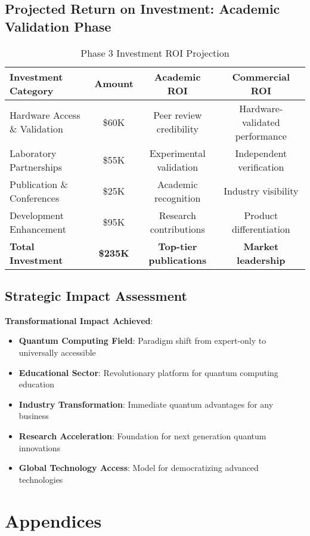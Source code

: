 \documentclass[12pt,a4paper]{article}
\begin{document}
\subsection{Projected Return on Investment: Academic Validation Phase}

\begin{table}[H]
\centering
\caption{Phase 3 Investment ROI Projection}
\begin{tabular}{|l|c|c|c|}
\hline
\textbf{Investment Category} & \textbf{Amount} & \textbf{Academic ROI} & \textbf{Commercial ROI} \\
\hline
Hardware Access \& Validation & \$60K & Peer review credibility & Hardware-validated performance \\
\hline
Laboratory Partnerships & \$55K & Experimental validation & Independent verification \\
\hline
Publication \& Conferences & \$25K & Academic recognition & Industry visibility \\
\hline
Development Enhancement & \$95K & Research contributions & Product differentiation \\
\hline
\textbf{Total Investment} & \textbf{\$235K} & \textbf{Top-tier publications} & \textbf{Market leadership} \\
\hline
\end{tabular}
\end{table}

\subsection{Strategic Impact Assessment}

\textbf{Transformational Impact Achieved}:
\begin{itemize}
    \item \textbf{Quantum Computing Field}: Paradigm shift from expert-only to universally accessible
    \item \textbf{Educational Sector}: Revolutionary platform for quantum computing education
    \item \textbf{Industry Transformation}: Immediate quantum advantages for any business
    \item \textbf{Research Acceleration}: Foundation for next generation quantum innovations
    \item \textbf{Global Technology Access}: Model for democratizing advanced technologies
\end{itemize}

\section{Appendices}
\end{document}
